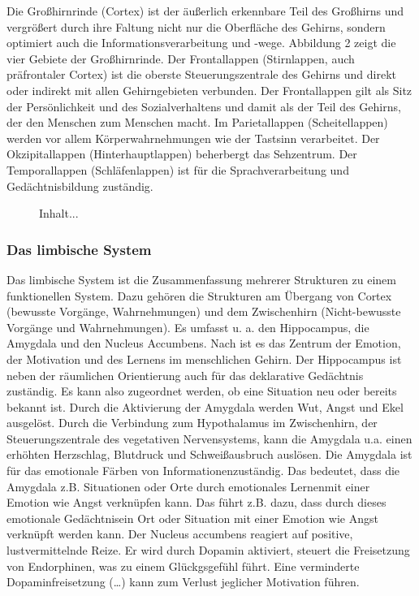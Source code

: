 Die Großhirnrinde (Cortex) ist der äußerlich erkennbare Teil des Großhirns und vergrößert durch ihre Faltung nicht nur die Oberfläche des Gehirns, sondern optimiert auch die Informationsverarbeitung und -wege. \citep[S. 8]{Nowka.2013} Abbildung 2 zeigt die vier Gebiete der Großhirnrinde. Der Frontallappen (Stirnlappen, auch präfrontaler Cortex) ist die oberste Steuerungszentrale des Gehirns und direkt oder indirekt mit allen Gehirngebieten verbunden. Der Frontallappen gilt als Sitz der Persönlichkeit und des Sozialverhaltens und damit als der Teil des Gehirns, der den Menschen zum Menschen macht. Im Parietallappen (Scheitellappen) werden vor allem Körperwahrnehmungen wie der Tastsinn verarbeitet. Der Okzipitallappen (Hinterhauptlappen) beherbergt das Sehzentrum. Der Temporallappen (Schläfenlappen) ist für die Sprachverarbeitung und Gedächtnisbildung zuständig. \citep{Schaefers.2014}

\begin{figure}
Inhalt...
\end{figure}

\subsubsection{Das limbische System}
Das limbische System ist die Zusammenfassung mehrerer Strukturen zu einem funktionellen System. Dazu gehören die Strukturen am \glqq Übergang von Cortex (bewusste Vorgänge, Wahrnehmungen) und dem Zwischenhirn (Nicht-bewusste Vorgänge und Wahrnehmungen).\grqq \citep[S. 36]{Derouiche.2011} Es umfasst u. a. den Hippocampus, die Amygdala und den Nucleus Accumbens. Nach \citet[S. 270]{Kirschbaum.2008} ist es das  \glqq Zentrum der Emotion, der Motivation und des Lernens im menschlichen Gehirn.\grqq 
\newline Der Hippocampus ist neben der räumlichen Orientierung auch für das deklarative Gedächtnis zuständig. Es kann also zugeordnet werden, ob eine Situation neu oder bereits bekannt ist. \citep[S. 36]{Derouiche.2011} Durch die Aktivierung der Amygdala werden Wut, Angst und Ekel ausgelöst. Durch die Verbindung zum Hypothalamus im Zwischenhirn, der Steuerungszentrale des vegetativen Nervensystems, kann die Amygdala u.a. einen erhöhten Herzschlag, Blutdruck und Schweißausbruch auslösen. \citep[S. 36f]{Derouiche.2011} Die Amygdala ist für das \glqq emotionale Färben von Informationen\grqq zuständig. \citep[S. 12]{Kirschbaum.2008} Das bedeutet, dass die Amygdala z.B. Situationen oder Orte durch \glqq emotionales Lernen\grqq mit einer Emotion wie Angst verknüpfen kann. Das führt z.B. dazu, dass durch dieses \glqq emotionale Gedächtnis\grqq ein Ort oder Situation mit einer Emotion wie Angst verknüpft werden kann. \citep[S. 37]{Derouiche.2011}    
\newline Der Nucleus accumbens reagiert auf positive, lustvermittelnde Reize. Er wird durch Dopamin aktiviert, steuert die Freisetzung von Endorphinen, was zu einem Glückgsgefühl führt. \glqq Eine verminderte Dopaminfreisetzung (…) kann zum Verlust jeglicher Motivation führen. \grqq \citep[S. 11]{Nowka.2013}

